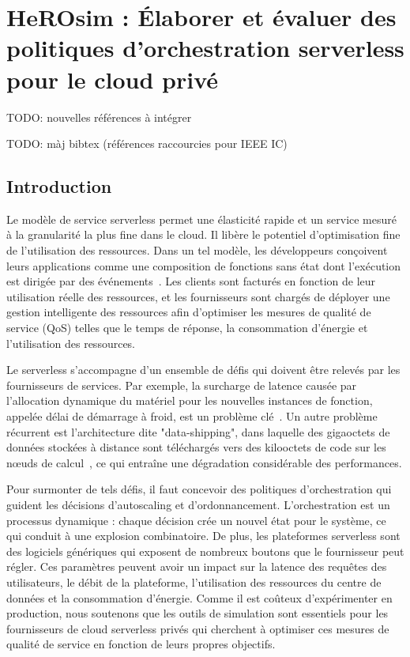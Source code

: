\chapter{HeROsim : Élaborer et évaluer des politiques d'orchestration serverless pour le cloud privé}
\label{chapter:herosim}

TODO: nouvelles références à intégrer~\cite{bambrikSurveyCloudComputing2020, byrneReviewCloudComputing2017}

TODO: màj bibtex (références raccourcies pour IEEE IC)

\section{Introduction}
\label{section:herosim-introduction}

Le modèle de service serverless permet une élasticité rapide et un service mesuré à la granularité la plus fine dans le cloud. Il libère le potentiel d'optimisation fine de l'utilisation des ressources. Dans un tel modèle, les développeurs conçoivent leurs applications comme une composition de fonctions sans état dont l'exécution est dirigée par des événements~\cite{SchleierSmith2021WhatSC}. 
Les clients sont facturés en fonction de leur utilisation réelle des ressources, et les fournisseurs sont chargés de déployer une gestion intelligente des ressources afin d'optimiser les mesures de qualité de service (QoS) telles que le temps de réponse, la consommation d'énergie et l'utilisation des ressources.

Le serverless s'accompagne d'un ensemble de défis qui doivent être relevés par les fournisseurs de services. Par exemple, la surcharge de latence causée par l'allocation dynamique du matériel pour les nouvelles instances de fonction, appelée délai de démarrage à froid, est un problème clé~\cite{Lannurien2023}. Un autre problème récurrent est l'architecture dite "data-shipping", dans laquelle des gigaoctets de données stockées à distance sont téléchargés vers des kilooctets de code sur les nœuds de calcul~\cite{yuFollowingDataNot}, ce qui entraîne une dégradation considérable des performances.

Pour surmonter de tels défis, il faut concevoir des politiques d'orchestration qui guident les décisions d'autoscaling et d'ordonnancement.
L'orchestration est un processus dynamique : chaque décision crée un nouvel état pour le système, ce qui conduit à une explosion combinatoire. De plus, les plateformes serverless sont des logiciels génériques qui exposent de nombreux boutons que le fournisseur peut régler. Ces paramètres peuvent avoir un impact sur la latence des requêtes des utilisateurs, le débit de la plateforme, l'utilisation des ressources du centre de données et la consommation d'énergie. Comme il est coûteux d'expérimenter en production, nous soutenons que les outils de simulation sont essentiels pour les fournisseurs de cloud serverless privés qui cherchent à optimiser ces mesures de qualité de service en fonction de leurs propres objectifs.

